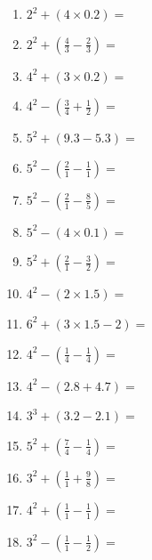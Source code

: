 \documentclass[12pt]{article}
\begin{document}
\begin{enumerate}
\newpage
\item \large $ 2^{2} + (4 \times 0.2) = $ \vspace{1.4cm}
\item \large $ 2^{2} + (\frac{4}{3} - \frac{2}{3}) = $ \vspace{1.4cm}
\item \large $ 4^{2} + (3 \times 0.2) = $ \vspace{1.4cm}
\item \large $ 4^{2} - (\frac{3}{4} + \frac{1}{2}) = $ \vspace{1.4cm}
\item \large $ 5^{2} + (9.3 - 5.3) = $ \vspace{1.4cm}
\item \large $ 5^{2} - (\frac{2}{1} - \frac{1}{1}) = $ \vspace{1.4cm}
\item \large $ 5^{2} - (\frac{2}{1} - \frac{8}{5}) = $ \vspace{1.4cm}
\item \large $ 5^{2} - (4 \times 0.1) = $ \vspace{1.4cm}
\item \large $ 5^{2} + (\frac{2}{1} - \frac{3}{2}) = $ \vspace{1.4cm}
\item \large $ 4^{2} - (2 \times 1.5) = $ \vspace{1.4cm}
\newpage
\item \large $ 6^{2} + (3 \times 1.5 - 2) = $ \vspace{1.4cm}
\item \large $ 4^{2} - (\frac{1}{4} - \frac{1}{4}) = $ \vspace{1.4cm}
\item \large $ 4^{2} - (2.8 + 4.7) = $ \vspace{1.4cm}
\item \large $ 3^{3} + (3.2 - 2.1) = $ \vspace{1.4cm}
\item \large $ 5^{2} + (\frac{7}{4} - \frac{1}{4}) = $ \vspace{1.4cm}
\item \large $ 3^{2} + (\frac{1}{1} + \frac{9}{8}) = $ \vspace{1.4cm}
\item \large $ 4^{2} + (\frac{1}{1} - \frac{1}{1}) = $ \vspace{1.4cm}
\item \large $ 3^{2} - (\frac{1}{1} - \frac{1}{2}) = $ \vspace{1.4cm}

\end{enumerate}
\end{document}
